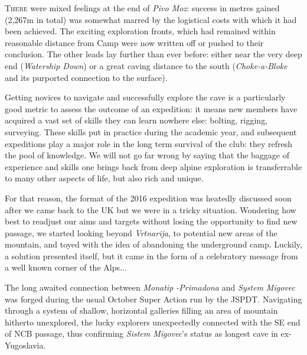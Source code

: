 \newpage
\begin{tcolorbox}

	\lettrine{T}{here} were mixed feelings at the end of \emph{Pivo Moz}: success in metres gained (2,267m in total) was somewhat marred by the logistical costs with which it had been achieved. The exciting exploration fronts, which had remained within reasonable distance from Camp were now written off or pushed to their conclusion. The other leads lay further than ever before: either near the very deep end (\emph{Watership Down}) or a great caving distance to the south (\emph{Choke-a-Bloke} and its purported connection to the surface).

	Getting novices to navigate and successfully explore the cave is a particularly good metric to assess the outcome of an expedition: it means new members have acquired a vast set of skills they can learn nowhere else: bolting, rigging, surveying. These skills put in practice during the academic year, and subsequent expeditions play a major role in the long term survival of the club: they refresh the pool of knowledge. We will not go far wrong by saying that the baggage of experience and skills one brings back from deep alpine exploration is transferrable to many other aspects of life, but also rich and unique.

	For that reason, the format of the 2016 expedition was heatedly discussed soon after we came back to the UK but we were in a tricky situation. Wondering how best to readjust our aims and targets without losing the opportunity to find new passage, we started looking beyond \emph{Vrtnarija}, to potential new areas of the mountain, and toyed with the idea of abandoning the underground camp. Luckily, a solution presented itself, but it came in the form of a celebratory message from a well known corner of the Alps...

	The long awaited connection between \emph{Monatip -Primadona} and \emph{System Migovec} was forged during the usual October Super Action run by the JSPDT. Navigating through a system of shallow, horizontal galleries filling an area of mountain hitherto unexplored, the lucky explorers unexpectedly connected with the SE end of NCB passage, thus confirming \emph{Sistem Migovec}'s status as longest cave in ex-Yugoslavia.
	\\
	\\
	\\
	
	
\end{tcolorbox}
